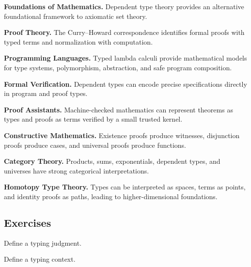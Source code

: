 \begin{applicationbox}

\textbf{Foundations of Mathematics.}
Dependent type theory provides an alternative foundational framework to
axiomatic set theory.

\medskip

\textbf{Proof Theory.}
The Curry--Howard correspondence identifies formal proofs with typed terms
and normalization with computation.

\medskip

\textbf{Programming Languages.}
Typed lambda calculi provide mathematical models for type systems,
polymorphism, abstraction, and safe program composition.

\medskip

\textbf{Formal Verification.}
Dependent types can encode precise specifications directly in program and
proof types.

\medskip

\textbf{Proof Assistants.}
Machine-checked mathematics can represent theorems as types and proofs as
terms verified by a small trusted kernel.

\medskip

\textbf{Constructive Mathematics.}
Existence proofs produce witnesses, disjunction proofs produce cases, and
universal proofs produce functions.

\medskip

\textbf{Category Theory.}
Products, sums, exponentials, dependent types, and universes have strong
categorical interpretations.

\medskip

\textbf{Homotopy Type Theory.}
Types can be interpreted as spaces, terms as points, and identity proofs as
paths, leading to higher-dimensional foundations.

\end{applicationbox}

\subsection{Exercises}
\label{subsec:type-theory-exercises}

\begin{exercise}[1]
Define a typing judgment.
\end{exercise}

\begin{exercise}[1]
Define a typing context.
\end{exercise}

